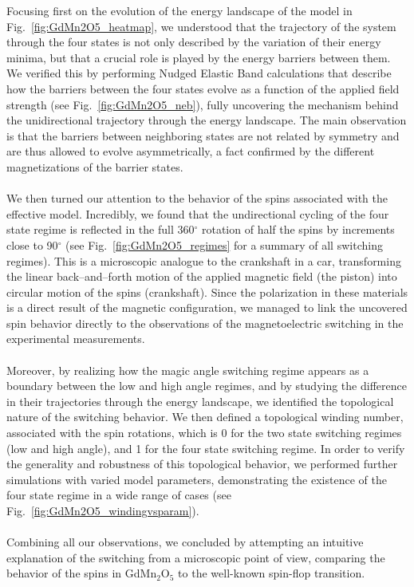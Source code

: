 Focusing first on the evolution of the energy landscape of the model in Fig.~\ref{fig:GdMn2O5_heatmap}, we understood that the trajectory of the system through the four states is not only described by the variation of their energy minima, but that a crucial role is played by the energy barriers between them.
We verified this by performing Nudged Elastic Band calculations that describe how the barriers between the four states evolve as a function of the applied field strength (see Fig.~\ref{fig:GdMn2O5_neb}), fully uncovering the mechanism behind the unidirectional trajectory through the energy landscape.
The main observation is that the barriers between neighboring states are not related by symmetry and are thus allowed to evolve asymmetrically, a fact confirmed by the different magnetizations of the barrier states.
\\\\
We then turned our attention to the behavior of the spins associated with the effective model. Incredibly, we found that the undirectional cycling of the four state regime is reflected in the full 360$^\circ$ rotation of half the spins by increments close to 90$^\circ$ (see Fig.~\ref{fig:GdMn2O5_regimes} for a summary of all switching regimes).
This is a microscopic analogue to the crankshaft in a car, transforming the linear back--and--forth motion of the applied magnetic field (the piston) into circular motion of the spins (crankshaft).
Since the polarization in these materials is a direct result of the magnetic configuration, we managed to link the uncovered spin behavior directly to the observations of the magnetoelectric switching in the experimental measurements.
\\\\
Moreover, by realizing how the magic angle switching regime appears as a boundary between the low and high angle regimes, and by studying the difference in their trajectories through the energy landscape, we identified the topological nature of the switching behavior.
We then defined a topological winding number, associated with the spin rotations, which is 0 for the two state switching regimes (low and high angle), and 1 for the four state switching regime.
In order to verify the generality and robustness of this topological behavior, we performed further simulations with varied model parameters, demonstrating the existence of the four state regime in a wide range of cases (see Fig.~\ref{fig:GdMn2O5_windingvsparam}).
\\\\
Combining all our observations, we concluded by attempting an intuitive explanation of the switching from a microscopic point of view, comparing the behavior of the spins in GdMn$_2$O$_5$ to the well-known spin-flop transition.
